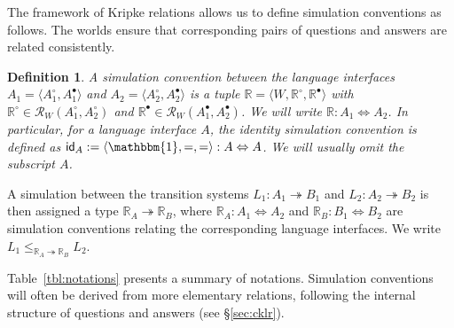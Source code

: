 \documentclass[draft,11pt]{report}
\newtheorem{definition}{Definition}
\newcommand{\kw}[1]{\ensuremath{ \mathsf{#1} }}
\newcommand{\que}{\circ}         %
\newcommand{\ans}{\bullet}       %
\begin{document}
The framework of Kripke relations allows us
to define simulation conventions as follows.
The worlds ensure that corresponding pairs of
questions and answers are related consistently.

\begin{definition} \label{def:simconv} %
A \emph{simulation convention} between the language interfaces
$A_1 = \langle A_1^\que, A_1^\ans \rangle$ and
$A_2 = \langle A_2^\que, A_2^\ans \rangle$
is a tuple $\mathbb{R} = \langle W, \mathbb{R}^\que, \mathbb{R}^\ans \rangle$
with $\mathbb{R}^\que \in \mathcal{R}_W(A_1^\que, A_2^\que)$
and $\mathbb{R}^\ans \in \mathcal{R}_W(A_1^\ans, A_2^\ans)$.
We will write $\mathbb{R} : A_1 \Leftrightarrow A_2$.
In particular,
for a language interface $A$,
the \emph{identity} simulation convention
is defined as
$\kw{id}_A := \langle \mathbbm{1}, {=}, {=} \rangle
  : A \Leftrightarrow A$.
We will usually omit the subscript $A$.
\end{definition}

A simulation between the transition systems
$L_1 : A_1 \twoheadrightarrow B_1$ and
$L_2 : A_2 \twoheadrightarrow B_2$
is then assigned a type $\mathbb{R}_A \twoheadrightarrow \mathbb{R}_B$,
where %
$\mathbb{R}_A : A_1 \Leftrightarrow A_2$ and
$\mathbb{R}_B : B_1 \Leftrightarrow B_2$
are simulation conventions
relating the corresponding language interfaces.
We write
$L_1 \le_{\mathbb{R}_A \twoheadrightarrow \mathbb{R}_B} L_2$.

Table~\ref{tbl:notations} presents a summary of notations.
Simulation conventions
will often be derived from
more elementary relations,
following the internal structure of questions and answers
(see \S\ref{sec:cklr}).
\end{document}
